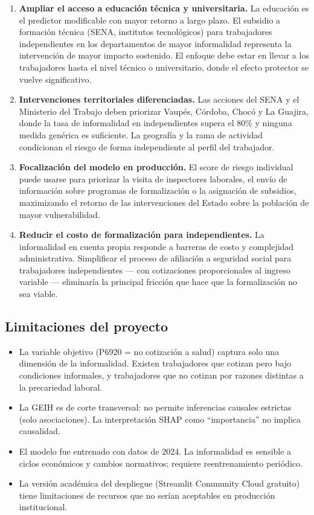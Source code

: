 \documentclass[12pt, a4paper]{article}
\begin{document}
\begin{enumerate}[label=\arabic*.]
  \item \textbf{Ampliar el acceso a educación técnica y universitaria.}
  La educación es el predictor modificable con mayor retorno a largo plazo. El subsidio
  a formación técnica (SENA, institutos tecnológicos) para trabajadores independientes
  en los departamentos de mayor informalidad representa la intervención de mayor
  impacto sostenido. El enfoque debe estar en llevar a los trabajadores hasta el
  nivel técnico o universitario, donde el efecto protector se vuelve significativo.

  \item \textbf{Intervenciones territoriales diferenciadas.} Las acciones del SENA
  y el Ministerio del Trabajo deben priorizar Vaupés, Córdoba, Chocó y La Guajira,
  donde la tasa de informalidad en independientes supera el 80\% y ninguna medida
  genérica es suficiente. La geografía y la rama de actividad condicionan el riesgo
  de forma independiente al perfil del trabajador.

  \item \textbf{Focalización del modelo en producción.} El score de riesgo individual
  puede usarse para priorizar la visita de inspectores laborales, el envío de
  información sobre programas de formalización o la asignación de subsidios,
  maximizando el retorno de las intervenciones del Estado sobre la población
  de mayor vulnerabilidad.

  \item \textbf{Reducir el costo de formalización para independientes.}
  La informalidad en cuenta propia responde a barreras de costo y complejidad
  administrativa. Simplificar el proceso de afiliación a seguridad social para
  trabajadores independientes — con cotizaciones proporcionales al ingreso variable —
  eliminaría la principal fricción que hace que la formalización no sea viable.
\end{enumerate}

\subsection{Limitaciones del proyecto}

\begin{itemize}[noitemsep]
  \item La variable objetivo (P6920 = no cotización a salud) captura solo una dimensión
  de la informalidad. Existen trabajadores que cotizan pero bajo condiciones informales,
  y trabajadores que no cotizan por razones distintas a la precariedad laboral.
  \item La GEIH es de corte transversal: no permite inferencias causales estrictas
  (solo asociaciones). La interpretación SHAP como ``importancia'' no implica causalidad.
  \item El modelo fue entrenado con datos de 2024. La informalidad es sensible a ciclos
  económicos y cambios normativos; requiere reentrenamiento periódico.
  \item La versión académica del despliegue (Streamlit Community Cloud gratuito) tiene
  limitaciones de recursos que no serían aceptables en producción institucional.
\end{itemize}
\end{document}
